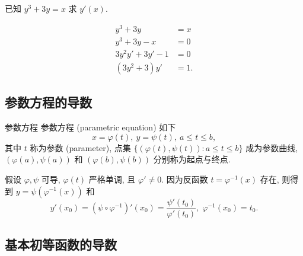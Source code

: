 \documentclass[cn,toc=twocol]{elegantbook}
\begin{document}
\vspace{0.5em}

\begin{example}
	已知 $y^3 + 3y = x$ 求 $y'(x)$.
\end{example}
\begin{solution}
	\[
		\begin{aligned}
			y^3 + 3y &= x\\
			y^3 + 3y - x &= 0\\
			3 y^2 y' + 3 y' - 1 &= 0\\
			(3 y^2 + 3)y' &= 1.
		\end{aligned}
	\]	
\end{solution}

\subsection{参数方程的导数}

\begin{definition}{参数方程}
	参数方程 (parametric equation) 如下
	\[
		x = \varphi(t),\ y= \psi(t),\ a \le t \le b,
	\]
	其中 $t$ 称为参数 (parameter), 点集 $\{(\varphi(t),\psi(t)): a \le t \le b\}$ 成为参数曲线, $(\varphi(a),\psi(a))$ 和 $(\varphi(b),\psi(b))$ 分别称为起点与终点.
\end{definition}


假设 $\varphi,\psi$ 可导, $\varphi(t)$ 严格单调, 且 $\varphi' \neq 0$. 因为反函数 $t = \varphi^{-1}(x)$ 存在, 则得到 $y = \psi(\varphi^{-1}(x))$ 和
\[
y'(x_0) = (\psi \circ \varphi^{-1})'(x_0) = \frac{\psi'(t_0)}{\varphi'(t_0)},\; \varphi^{-1}(x_0) = t_0.
\]

\subsection{基本初等函数的导数}
\end{document}
